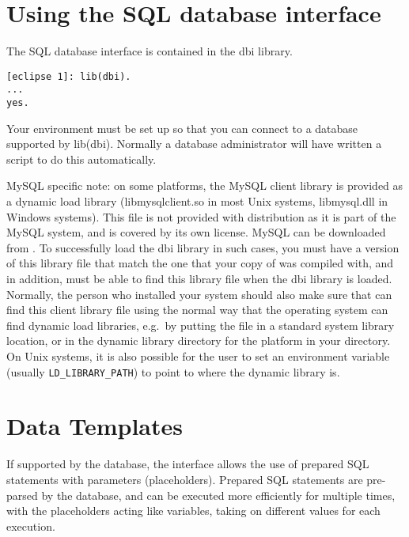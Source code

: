 \section{Using the SQL database interface}
The SQL database interface is contained in the dbi library.
\begin{verbatim}
[eclipse 1]: lib(dbi). 
...
yes.
\end{verbatim}

Your environment must be set up so that you can connect to a
database supported by lib(dbi). Normally a database administrator will 
have written a script to do this automatically. 

MySQL specific note: on some platforms, the MySQL client library is
provided as a dynamic load library (libmysqlclient.so in most Unix systems,
libmysql.dll in Windows systems). This file is
not provided with {\eclipse} distribution as it is part of the MySQL
system, and is covered by its own license. MySQL can be downloaded from 
.
To successfully load the dbi library in such cases, you must have a version
of this library file that match the one that your copy of {\eclipse} was
compiled with, and in addition, {\eclipse} must be able to find this
library file when the dbi library is loaded.  Normally, the person who
installed your {\eclipse} system should also make sure that {\eclipse} can
find this client library file using the normal way that the operating
system can find dynamic load libraries, e.g.\ by putting the file in a
standard system library location, or in the {\eclipse} dynamic library
directory for the platform in your {\eclipse} directory. On Unix systems,
it is also possible for the user to set an environment variable (usually
{\tt LD_LIBRARY_PATH}) to point to where the dynamic library is.
 
\section{Data Templates}
\label{data-templates}

If supported by the database, the interface allows the use of
prepared SQL statements with parameters (placeholders). Prepared SQL
statements are pre-parsed by the database, and can be executed more
efficiently for multiple times, with the placeholders acting like variables,
taking on different values for each execution.

